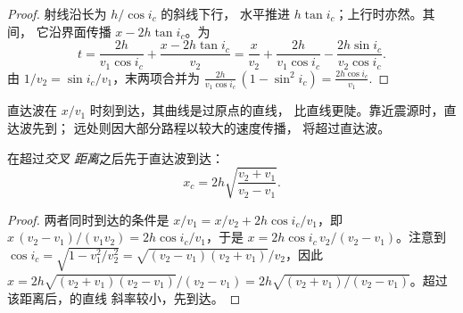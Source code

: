 \begin{proof}
射线沿长为 $h/\cos i_c$ 的斜线下行，
水平推进 $h\tan i_c$；上行时亦然。其间，
它沿界面传播 $x - 2h\tan i_c$。为
\[
  t = \frac{2h}{v_1\cos i_c} + \frac{x - 2h\tan i_c}{v_2}
    = \frac{x}{v_2} + \frac{2h}{v_1\cos i_c} - \frac{2h\sin i_c}{v_2\cos i_c}.
\]
由 $1/v_2 = \sin i_c/v_1$，末两项合并为
$\frac{2h}{v_1\cos i_c}\,(1 - \sin^2 i_c) = \frac{2h\cos i_c}{v_1}$.
\end{proof}

直达波在 $x/v_1$ 时刻到达，其曲线是过原点的直线，
比直线更陡。靠近震源时，直达波先到；
远处则因大部分路程以较大的速度传播，
将超过直达波。

\begin{proposition}[交叉距离]\label{prop:g11:seismic-structure:crossover}
在超过\emph{交叉
距离}之后先于直达波到达：
\[
  x_c = 2h\sqrt{\frac{v_2 + v_1}{v_2 - v_1}}.
\]
\end{proposition}

\begin{proof}
两者同时到达的条件是 $x/v_1 = x/v_2 + 2h\cos i_c/v_1$，即
$x\,(v_2 - v_1)/(v_1 v_2) = 2h\cos i_c/v_1$，于是 $x = 2h\cos i_c\,v_2/(v_2 -
v_1)$。注意到 $\cos i_c = \sqrt{1 - v_1^2/v_2^2} = \sqrt{(v_2 - v_1)(v_2 +
v_1)}/v_2$，因此 $x = 2h\sqrt{(v_2 + v_1)(v_2 - v_1)}/(v_2 - v_1) =
2h\sqrt{(v_2 + v_1)/(v_2 - v_1)}$。超过该距离后，的直线
斜率较小，先到达。
\end{proof}

